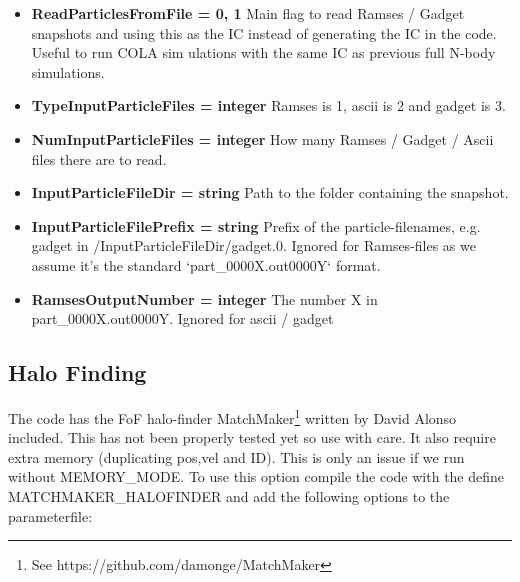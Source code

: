 \documentclass[usenatbib]{article}
\begin{document}
\begin{itemize}

\item \textbf{ReadParticlesFromFile = 0, 1} Main flag to read Ramses / Gadget snapshots and using this as the IC instead of generating the IC in the code. Useful to run COLA sim
ulations with the same IC as previous full N-body simulations.

\item \textbf{TypeInputParticleFiles = integer}  Ramses is 1, ascii is 2 and gadget is 3.

\item \textbf{NumInputParticleFiles = integer} How many Ramses / Gadget / Ascii files there are to read.

\item \textbf{InputParticleFileDir = string} Path to the folder containing the snapshot.

\item \textbf{InputParticleFilePrefix = string} Prefix of the particle-filenames, e.g. gadget in /InputParticleFileDir/gadget.0. Ignored for Ramses-files as we assume it's the standard `part\_0000X.out0000Y` format.

\item \textbf{RamsesOutputNumber = integer} The number X in part\_0000X.out0000Y. Ignored for ascii / gadget

\end{itemize}

\subsection*{Halo Finding}

The code has the FoF halo-finder MatchMaker\footnote{See https://github.com/damonge/MatchMaker} written by David Alonso included. This has not been properly tested yet so use with care. It also require extra memory (duplicating pos,vel and ID). This is only an issue if we run without MEMORY\_MODE. To use this option compile the code with the define MATCHMAKER\_HALOFINDER and add the following options to the parameterfile:
\end{document}
